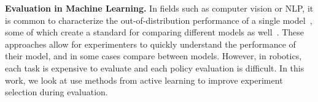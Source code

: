 \textbf{Evaluation in Machine Learning.}
In fields such as computer vision or NLP, it is common to characterize the out-of-distribution performance of a single model~\cite{wang2021cline, hendrycks2020pretrained, recht2019imagenet, hendrycks2019benchmarking,liang2022holistic, chang2024survey, gardner2020evaluating}, some of which create a standard for comparing different models as well~\cite{liang2022holistic}. 
These approaches allow for experimenters to quickly understand the performance of their model, and in some cases compare between models.
However, in robotics, each task is expensive to evaluate and each policy evaluation is difficult. 
In this work, we look at use methods from active learning to improve experiment selection during evaluation.

